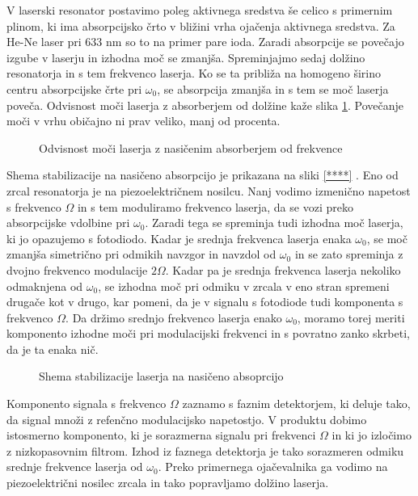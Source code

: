 V laserski resonator postavimo poleg aktivnega sredstva še celico s
primernim plinom, ki ima absorpcijsko črto v bližini vrha ojačenja
aktivnega sredstva. Za He-Ne laser pri 633 nm so to na primer pare ioda.
Zaradi absorpcije se povečajo izgube v laserju in izhodna moč se zmanjša.
Spreminjajmo sedaj dolžino resonatorja in s tem frekvenco laserja. Ko se ta
približa na homogeno širino centru absorpcijske črte pri $\omega_0$, se
absorpcija zmanjša in s tem se moč laserja poveča. Odvisnost moči
laserja z absorberjem od dolžine kaže slika \ref{s5.12}. Povečanje moči
v vrhu običajno ni prav veliko, manj od procenta.

\begin{figure}[tbp]
\label{s5.12} \vskip 5cm
\caption{Odvisnost moči laserja z nasičenim absorberjem od frekvence}
\end{figure}

Shema stabilizacije na nasičeno absorpcijo je prikazana na sliki \ref{****}%
. Eno od zrcal resonatorja je na piezoelektričnem nosilcu. Nanj vodimo
izmenično napetost s frekvenco $\Omega$ in s tem moduliramo frekvenco
laserja, da se vozi preko absorpcijske vdolbine pri $\omega_0$. Zaradi tega
se spreminja tudi izhodna moč laserja, ki jo opazujemo s fotodiodo. Kadar
je srednja frekvenca laserja enaka $\omega_0$, se moč zmanjša simetrično
pri odmikih navzgor in navzdol od $\omega_0$ in se zato spreminja z dvojno
frekvenco modulacije $2\Omega$. Kadar pa je srednja frekvenca laserja
nekoliko odmaknjena od $\omega_0$, se izhodna moč pri odmiku v zrcala v eno
stran spremeni drugače kot v drugo, kar pomeni, da je v signalu s fotodiode
tudi komponenta s frekvenco $\Omega$. Da držimo srednjo frekvenco laserja
enako $\omega_0$, moramo torej meriti komponento izhodne moči pri
modulacijski frekvenci in s povratno zanko skrbeti, da je ta enaka nič.

\begin{figure}[tbp]
\label{s5.13} \vskip 7cm
\caption{Shema stabilizacije laserja na nasičeno absoprcijo}
\end{figure}

Komponento signala s frekvenco $\Omega$ zaznamo s faznim detektorjem, ki
deluje tako, da signal množi z refenčno modulacijsko napetostjo. V
produktu dobimo istosmerno komponento, ki je sorazmerna signalu pri
frekvenci $\Omega$ in ki jo izločimo z nizkopasovnim filtrom. Izhod iz
faznega detektorja je tako sorazmeren odmiku srednje frekvence laserja od $%
\omega_0$. Preko primernega ojačevalnika ga vodimo na piezoelektrični
nosilec zrcala in tako popravljamo dolžino laserja.

